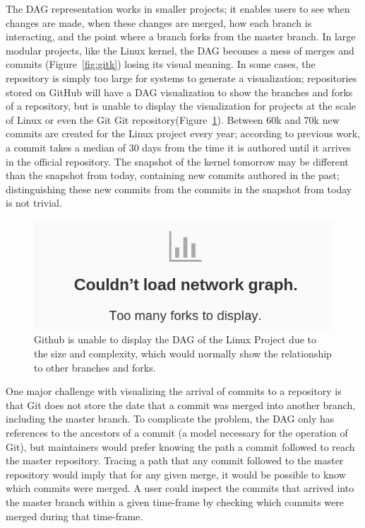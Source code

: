 \documentclass[draft]{IEEEtran}
\begin{document}
The DAG representation works in smaller projects; it enables users to
see when changes are made, when these changes are merged, how each
branch is interacting, and the point where a branch forks from the
master branch. In large modular projects, like the Linux kernel, the DAG
becomes a mess of merges and commits (Figure~\ref{fig:gitk}) losing its
visual meaning. In some cases, the repository is simply too large for
systems to generate a visualization; repositories stored on GitHub will
have a DAG visualization to show the branches and forks of a
repository, but is unable to display the visualization for projects at
the scale of Linux or even the Git Git
repository(Figure~\ref{fig:gitfail}). Between 60k and 70k new commits
are created for the Linux project every year; according to previous
work\cite{German2015}, a commit takes a median of 30 days from the time
it is authored until it arrives in the official repository. The snapshot
of the kernel tomorrow may be different than the snapshot from today,
containing new commits authored in the past; distinguishing these new
commits from the commits in the snapshot from today is not trivial.

\begin{figure}
  \centering
  \includegraphics[width=0.8\linewidth]{figures/github_viewer.png}
  \caption{Github is unable to display the DAG of the Linux
    Project due to the size and complexity, which would normally
    show the relationship to other branches and forks.}
  \label{fig:gitfail}
\end{figure}



One major challenge with visualizing the arrival of commits to a repository is that
Git does not store the date that a commit was merged into another branch, including
the master branch. To complicate the problem, the DAG only has references to the
ancestors of a commit (a model necessary for the operation of Git), but maintainers
would prefer knowing the path a commit followed to reach the master repository.
Tracing a path that any commit followed to the master repository would imply that
for any given merge, it would be possible to know which commits were merged. A user
could inspect the commits that arrived into the master branch within a given
time-frame by checking which commits were merged during that time-frame.
\end{document}

